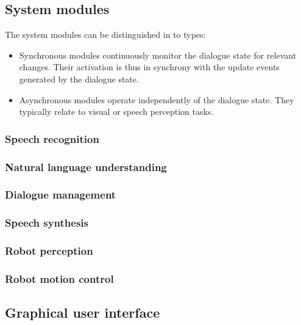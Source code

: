 \subsection{System modules}

The system modules can be distinguished in to types: \begin{itemize}
\item Synchronous modules continuously monitor the dialogue state for relevant changes.  Their activation is thus in synchrony with the update events generated by the dialogue state.
\item Asynchronous modules operate independently of the dialogue state.  They typically relate to visual or speech perception tasks.
\end{itemize}



\subsubsection*{Speech recognition}

\subsubsection*{Natural language understanding}

\subsubsection*{Dialogue management}

\subsubsection*{Speech synthesis}

\subsubsection*{Robot perception}

\subsubsection*{Robot motion control}

\subsection{Graphical user interface}

